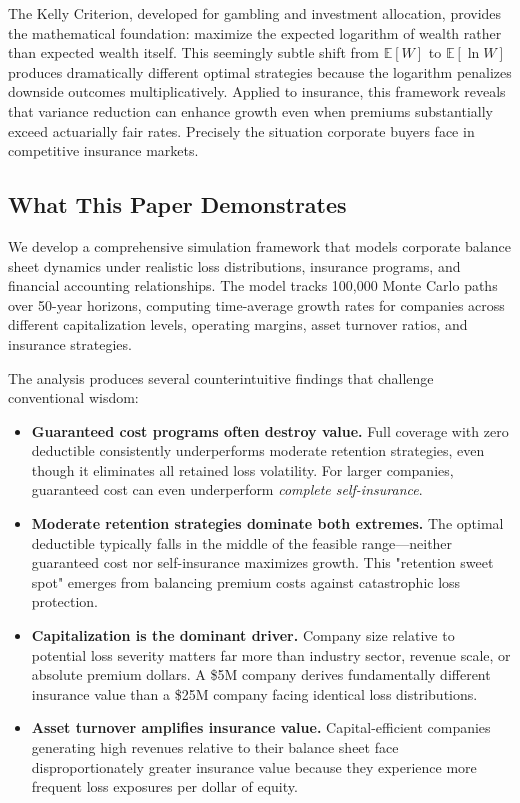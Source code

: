 \documentclass[11pt,letterpaper]{article}
\begin{document}
The Kelly Criterion, developed for gambling and investment allocation, provides the mathematical foundation: maximize the expected logarithm of wealth rather than expected wealth itself. This seemingly subtle shift from $\mathbb{E}[W]$ to $\mathbb{E}[\ln W]$ produces dramatically different optimal strategies because the logarithm penalizes downside outcomes multiplicatively. Applied to insurance, this framework reveals that variance reduction can enhance growth even when premiums substantially exceed actuarially fair rates. Precisely the situation corporate buyers face in competitive insurance markets.

\subsection{What This Paper Demonstrates}

We develop a comprehensive simulation framework that models corporate balance sheet dynamics under realistic loss distributions, insurance programs, and financial accounting relationships. The model tracks 100,000 Monte Carlo paths over 50-year horizons, computing time-average growth rates for companies across different capitalization levels, operating margins, asset turnover ratios, and insurance strategies.

The analysis produces several counterintuitive findings that challenge conventional wisdom:

\begin{itemize}
    \item \textbf{Guaranteed cost programs often destroy value.} Full coverage with zero deductible consistently underperforms moderate retention strategies, even though it eliminates all retained loss volatility. For larger companies, guaranteed cost can even underperform \emph{complete self-insurance}.

    \item \textbf{Moderate retention strategies dominate both extremes.} The optimal deductible typically falls in the middle of the feasible range—neither guaranteed cost nor self-insurance maximizes growth. This "retention sweet spot" emerges from balancing premium costs against catastrophic loss protection.

    \item \textbf{Capitalization is the dominant driver.} Company size relative to potential loss severity matters far more than industry sector, revenue scale, or absolute premium dollars. A \$5M company derives fundamentally different insurance value than a \$25M company facing identical loss distributions.

    \item \textbf{Asset turnover amplifies insurance value.} Capital-efficient companies generating high revenues relative to their balance sheet face disproportionately greater insurance value because they experience more frequent loss exposures per dollar of equity.
\end{itemize}
\end{document}
